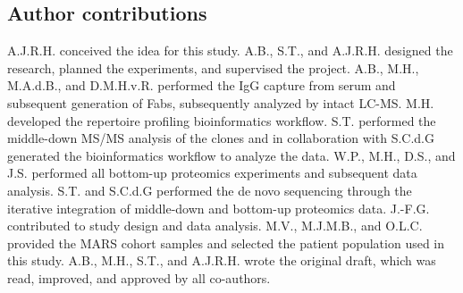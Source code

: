 \subsection{Author contributions}
A.J.R.H. conceived the idea for this study. A.B., S.T., and A.J.R.H. designed the research, planned the experiments, and supervised the project. A.B., M.H., M.A.d.B., and D.M.H.v.R. performed the IgG capture from serum and subsequent generation of Fabs, subsequently analyzed by intact LC-MS. M.H. developed the repertoire profiling bioinformatics workflow. S.T. performed the middle-down MS/MS analysis of the clones and in collaboration with S.C.d.G generated the bioinformatics workflow to analyze the data. W.P., M.H., D.S., and J.S. performed all bottom-up proteomics experiments and subsequent data analysis. S.T. and S.C.d.G performed the de novo sequencing through the  iterative integration of middle-down and bottom-up proteomics data. J.-F.G. contributed to study design and data analysis. M.V., M.J.M.B., and O.L.C. provided the MARS cohort samples and selected the patient population used in this study. A.B., M.H., S.T., and A.J.R.H. wrote the original draft, which was read, improved, and approved by all co-authors.

